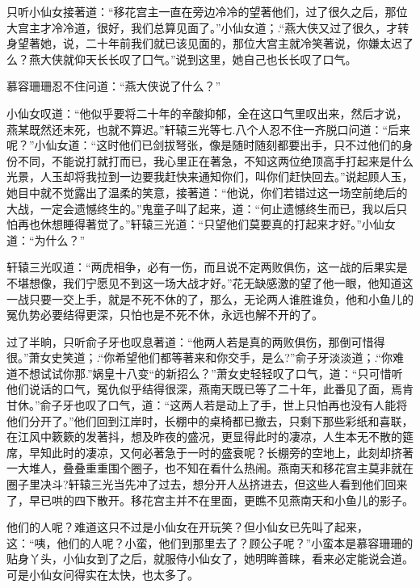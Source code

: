\documentclass[12pt,oneside]{book}
\begin{document}
只听小仙女接著道：``移花宫主一直在旁边冷冷的望著他们，过了很久之后，那位大宫主才冷冷道，很好，我们总算见面了。''小仙女道；.``燕大侠又过了很久，才转身望著她，说，二十年前我们就已该见面的，那位大宫主就冷笑著说，你嫌太迟了么？燕大侠就仰天长长叹了囗气。''说到这里，她自己也长长叹了口气。

慕容珊珊忍不住问道：``燕大侠说了什么？''

小仙女叹道：``他似乎要将二十年的辛酸抑郁，全在这口气里叹出来，然后才说，燕某既然还末死，也就不算迟。''轩辕三光等七.八个人忍不住一齐脱口问道：``后来呢？''小仙女道：``这时他们已剑拔弩张，像是随时随刻都要出手，只不过他们的身份不同，不能说打就打而已，我心里正在著急，不知这两位绝顶高手打起来是什么光景，人玉却将我拉到一边要我赶快来通知你们，叫你们赶快回去。''说起顾人玉，她目中就不觉露出了温柔的笑意，接著道：``他说，你们若错过这一场空前绝后的大战，一定会遗憾终生的。''鬼童子叫了起来，道：``何止遗憾终生而已，我以后只怕再也休想睡得著觉了。''轩辕三光道：``只望他们莫要真的打起来才好。''小仙女道：``为什么？''

轩辕三光叹道：``两虎相争，必有一伤，而且说不定两败俱伤，这一战的后果实是不堪想像，我们宁愿见不到这一场大战才好。''花无缺感激的望了他一眼，他知道这一战只要一交上手，就是不死不休的了，那么，无论两人谁胜谁负，他和小鱼儿的冤仇势必要结得更深，只怕也是不死不休，永远也解不开的了。

过了半晌，只听俞子牙也叹息著道：``他两人若是真的两败俱伤，那倒可惜得很。''萧女史笑道；.``你希望他们都等著来和你交手，是么?''俞子牙淡淡道；.``你难道不想试试你那.''娲皇十八变``的新招么？''萧女史轻轻叹了口气，道：``只可惜听他们说话的口气，冤仇似乎结得很深，燕南天既已等了二十年，此番见了面，焉肯甘休。''俞子牙也叹了口气，道：``这两人若是动上了手，世上只怕再也没有人能将他们分开了。''他们回到江岸时，长棚中的桌椅都已撤去，只剩下那些彩纸和喜联，在江风中簌簌的发著抖，想及昨夜的盛况，更显得此时的凄凉，人生本无不散的筵席，早知此时的凄凉，又何必著急于一时的盛衰呢？长棚旁的空地上，此刻却挤著一大堆人，叠叠重重围个圈子，也不知在看什么热闹。燕南天和移花宫主莫非就在圈子里决斗?轩辕三光当先冲了过去，想分开人丛挤进去，但这些人看到他们回来了，早已哄的四下散开。移花宫主并不在里面，更瞧不见燕南天和小鱼儿的影子。

他们的人呢？难道这只不过是小仙女在开玩笑？但小仙女已先叫了起来，这：``咦，他们的人呢？小蛮，他们到那里去了？顾公子呢？''小蛮本是慕容珊珊的贴身丫头，小仙女到了之后，就服侍小仙女了，她明眸善睐，看来必定能说会道。可是小仙女问得实在太快，也太多了。
\end{document}
